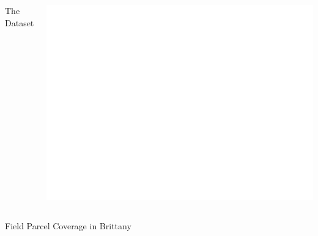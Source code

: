 \documentclass[%
  aspectratio=169,
  9pt,
  USenglish,
  titlegraphic, %
  affiliationintitlepagehead,
  affiliation,
]{beamer}
\begin{document}
{
	\begin{frame}[plain]
	
	\vfill
	\Huge\color{white}
	\begin{center}
		\begin{columns}
			\vspace{7em}
			
			\hfill 
			The Dataset
			
			\includegraphics[width=\textwidth]{images/map/breizh_white}
		\end{columns}
		\small\raggedleft Field Parcel Coverage in Brittany
	\end{center}
	
	\vfill
\end{frame}
}
\end{document}
